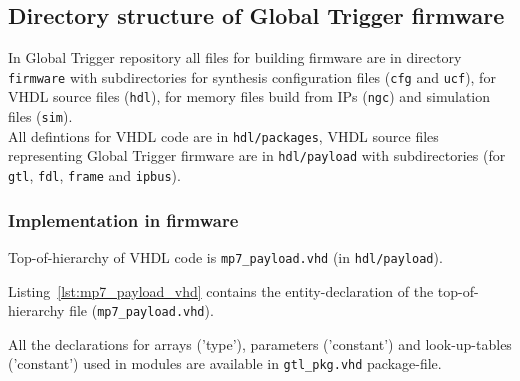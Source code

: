 \subsection{Directory structure of Global Trigger firmware} \label{sec:fw:dir_struct_gt_fw}

In Global Trigger repository all files for building firmware are in directory \texttt{firmware} with subdirectories for synthesis configuration files (\texttt{cfg} and \texttt{ucf}), for VHDL source files (\texttt{hdl}), for memory files build from IPs (\texttt{ngc}) and simulation files (\texttt{sim}).\\
All defintions for VHDL code are in \texttt{hdl/packages}, VHDL source files representing Global Trigger firmware are in \texttt{hdl/payload} with subdirectories (for \texttt{gtl}, \texttt{fdl}, \texttt{frame} and \texttt{ipbus}).

\subsubsection{Implementation in firmware}
\label{sec:fw:implementation_firmware}

Top-of-hierarchy of VHDL code is \texttt{mp7\_payload.vhd} (in \texttt{hdl/payload}).

Listing~\ref{lst:mp7_payload_vhd} contains the entity-declaration of the top-of-hierarchy file (\texttt{mp7\_payload.vhd}).



All the declarations for arrays ('type'), parameters ('constant') and look-up-tables ('constant') used in modules are available in \texttt{gtl\_pkg.vhd} package-file.

